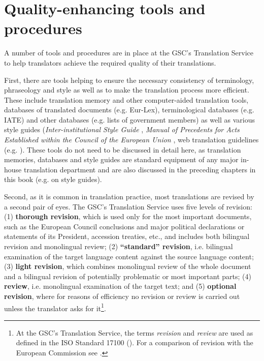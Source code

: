 \documentclass[output=paper]{langsci/langscibook}
\begin{document}
\section{Quality-enhancing tools and procedures}\label{sec:hanzl:hanzl:3}

A number of tools and procedures are in place at the GSC's Translation Service to help translators achieve the required quality of their translations.

First, there are tools helping to ensure the necessary consistency of terminology, phraseology and style as well as to make the translation process more efficient. These include translation memory and other computer-aided translation tools, databases of translated documents (e.g. Eur-Lex), terminological databases (e.g. IATE) and other databases (e.g. lists of government members) as well as various style guides (\textit{Inter-institutional Style Guide} \citep{PublicationsOffice2011}, \textit{Manual of Precedents for Acts Established within the Council of the European Union} \citep{Council2010a}, web translation guidelines (e.g. \citealt{Council2016b}). These tools do not need to be discussed in detail here, as translation memories, databases and style guides are standard equipment of any major in-house translation department and are also discussed in the preceding chapters in this book (e.g. \citeauthor{Svoboda2013} on style guides).

Second, as it is common in translation practice, most translations are revised by a second pair of eyes. The GSC's Translation Service uses five levels of revision: (1) \textbf{thorough revision}, which is used only for the most important documents, such as the European Council conclusions and major political declarations or statements of its President, accession treaties, etc., and includes both bilingual revision and monolingual review; (2) \textbf{“standard” revision}, i.e. bilingual examination of the target language content against the source language content; (3) \textbf{light revision}, which combines monolingual review of the whole document and a bilingual revision of potentially problematic or most important parts; (4) \textbf{review}, i.e. monolingual examination of the target text; and (5) \textbf{optional revision}, where for reasons of efficiency no revision or review is carried out unless the translator asks for it\footnote{At the GSC's Translation Service, the terms \textit{revision} and \textit{review} are used as defined in the ISO Standard 17100 (\citeyear{ISO2015}). For a comparison of revision with the European Commission see \citet{Martin2007}.}.
\end{document}
